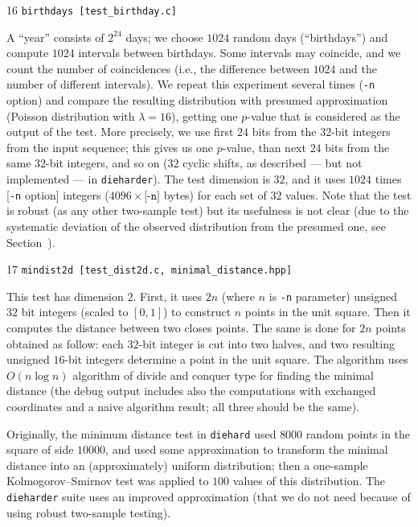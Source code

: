 \documentclass[12pt,a4paper,fullpage]{article}
\begin{document}
\begin{description}
\item{16} \texttt{birthdays [test\_birthday.c]}

A ``year'' consists of $2^{24}$ days; we choose $1024$ random days (``birthdays'') and compute $1024$ intervals between birthdays. Some intervals may coincide, and we count the number of coincidences (i.e., the difference between $1024$ and the number of different intervals). We repeat this experiment several times  (\texttt{-n} option) and compare the resulting distribution with presumed approximation (Poisson distribution with $\lambda=16$), getting one $p$-value that is considered as the output of the test. More precisely, we use first $24$ bits from the $32$-bit integers from the input sequence; this gives us one $p$-value, than next $24$ bits from the same $32$-bit integers, and so on ($32$ cyclic shifts, as described --- but not implemented --- in \texttt{dieharder}). The test dimension is $32$, and it uses $1024$ times [\texttt{-n} option] integers ($4096\times \texttt{[-n]}$ bytes) for each set of $32$ values. Note that the test is robust (as any other two-sample test) but its usefulness is not clear (due to the systematic deviation of the observed distribution from the presumed one, see Section~\cite[Section 7.1, Figure~7.2]{shen-romashchenko-robust}).

\item{17} \texttt{mindist2d [test\_dist2d.c, minimal\_distance.hpp]}

This test has dimension $2$. First, it uses $2n$ (where $n$ is \texttt{-n} parameter) unsigned $32$ bit integers (scaled to $[0,1]$) to construct $n$ points in the unit square. Then it computes the distance between two closes points. The same is done for $2n$ points obtained as follow: each $32$-bit integer is cut into two halves, and two resulting unsigned $16$-bit integers determine a point in the unit square. The algorithm uses $O(n\log n)$ algorithm of divide and conquer type for finding the minimal distance (the debug output includes also the computations with exchanged coordinates and a naive algorithm result; all three should be the same).

Originally, the minimum distance test in \texttt{diehard} used $8000$ random points in the square of side $10000$, and used some approximation to transform the minimal distance into an (approximately) uniform distribution; then a one-sample Kolmogorov--Smirnov test was applied to $100$ values of this distribution. The \texttt{dieharder} suite uses an improved approximation (that we do not need because of using robust two-sample testing).


\end{description}
\end{document}
